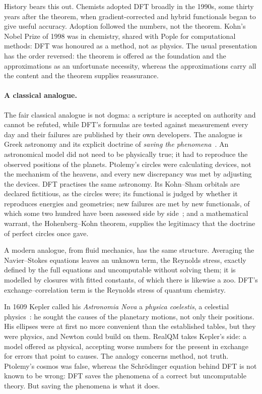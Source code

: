 History bears this out. Chemists adopted DFT broadly in the 1990s, some thirty years after the theorem, when
gradient-corrected and hybrid functionals began to give useful accuracy. Adoption followed the numbers, not
the theorem. Kohn's Nobel Prize of 1998 was in chemistry, shared with Pople for computational methods: DFT
was honoured as a method, not as physics. The usual presentation has the order reversed: the theorem is
offered as the foundation and the approximations as an unfortunate necessity, whereas the approximations
carry all the content and the theorem supplies reassurance.

\paragraph{A classical analogue.} The fair classical analogue is not dogma: a scripture is accepted on
authority and cannot be refuted, while DFT's formulas are tested against measurement every day and their
failures are published by their own developers. The analogue is Greek astronomy and its explicit doctrine of
\emph{saving the phenomena}~\cite{Duhem1908}. An astronomical model did not need to be physically true; it
had to reproduce the observed positions of the planets. Ptolemy's circles were calculating devices, not the
mechanism of the heavens, and every new discrepancy was met by adjusting the devices. DFT practises the same
astronomy. Its Kohn--Sham orbitals are declared fictitious, as the circles were; its functional is judged by
whether it reproduces energies and geometries; new failures are met by new functionals, of which some two
hundred have been assessed side by side~\cite{MHG17}; and a mathematical warrant, the Hohenberg--Kohn
theorem, supplies the legitimacy that the doctrine of perfect circles once gave.

A modern analogue, from fluid mechanics, has the same structure. Averaging the Navier--Stokes equations
leaves an unknown term, the Reynolds stress, exactly defined by the full equations and uncomputable without
solving them; it is modelled by closures with fitted constants, of which there is likewise a zoo. DFT's
exchange--correlation term is the Reynolds stress of quantum chemistry.

In 1609 Kepler called his \emph{Astronomia Nova} a \emph{physica coelestis}, a celestial
physics~\cite{Kepler1609}: he sought the causes of the planetary motions, not only their positions. His
ellipses were at first no more convenient than the established tables, but they were physics, and Newton
could build on them. RealQM takes Kepler's side: a model offered as physical, accepting worse numbers for the
present in exchange for errors that point to causes. The analogy concerns method, not truth. Ptolemy's
cosmos was false, whereas the Schr\"odinger equation behind DFT is not known to be wrong: DFT saves the
phenomena of a correct but uncomputable theory. But saving the phenomena is what it does.

